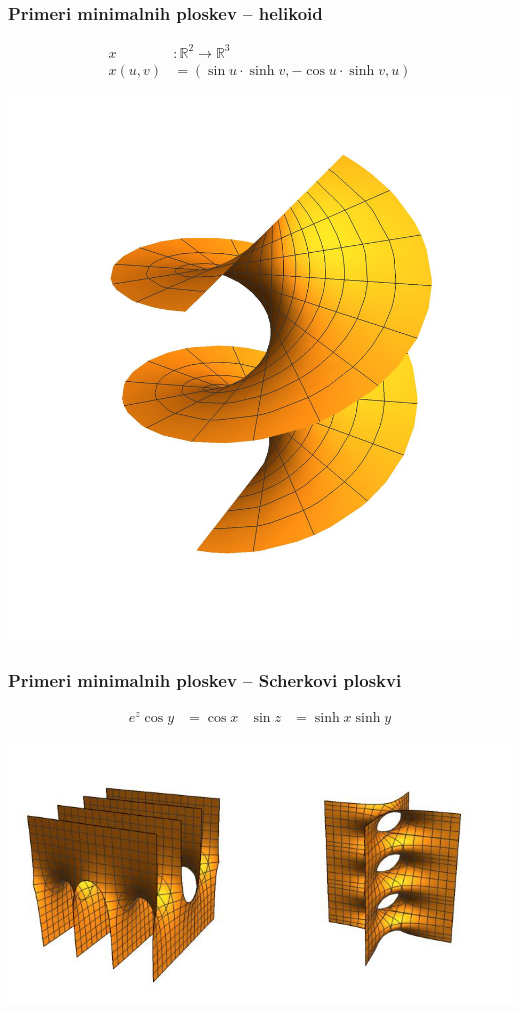 \documentclass[9pt, table]{beamer}
\newcommand{\R}{\mathbb R}
\begin{document}
\begin{frame}
\frametitle{Primeri minimalnih ploskev -- helikoid}

\begin{align*}
x &\colon \R^{2} \to \R^{3} \\
x(u,v) &= (\sin u \cdot \sinh v, -\cos u \cdot \sinh v, u)
\end{align*}
%
\begin{center}
\includegraphics[scale=0.4]{helikoid.jpg}
\end{center}

\end{frame}


\begin{frame}
\frametitle{Primeri minimalnih ploskev -- Scherkovi ploskvi}

\begin{align*}
e^{z} \cos y &= \cos x & \sin z &= \sinh x \sinh y
\end{align*}

\includegraphics[scale=0.8]{scherk.jpg}

\end{frame}
\end{document}
